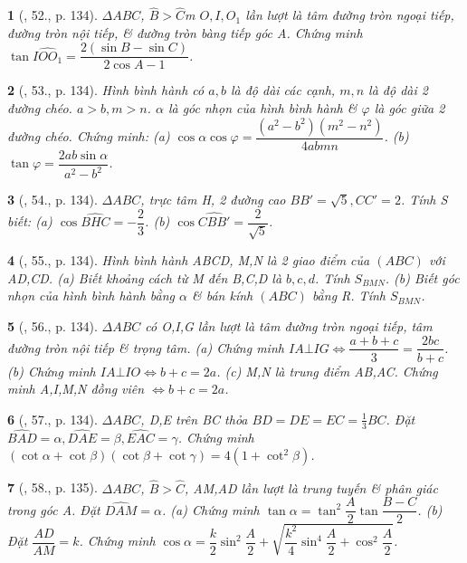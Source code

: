 \documentclass{article}
\newtheorem{baitoan}{}
\begin{document}
\begin{baitoan}[\cite{TLCT_hinh_hoc_10}, 52., p. 134]
	$\Delta ABC$, $\widehat{B} > \widehat{C}$m $O,I,O_1$ lần lượt là tâm đường tròn ngoại tiếp, đường tròn nội tiếp, \& đường tròn bàng tiếp góc A. Chứng minh $\tan\widehat{IOO_1} = \dfrac{2(\sin B - \sin C)}{2\cos A - 1}$.
\end{baitoan}

\begin{baitoan}[\cite{TLCT_hinh_hoc_10}, 53., p. 134]
	Hình bình hành có $a,b$ là độ dài các cạnh, $m,n$ là độ dài 2 đường chéo. $a > b,m > n$. $\alpha$ là góc nhọn của hình bình hành \& $\varphi$ là góc giữa 2 đường chéo. Chứng minh: (a) $\cos\alpha\cos\varphi = \dfrac{(a^2 - b^2)(m^2 - n^2)}{4abmn}$. (b) $\tan\varphi = \dfrac{2ab\sin\alpha}{a^2 - b^2}$.
\end{baitoan}

\begin{baitoan}[\cite{TLCT_hinh_hoc_10}, 54., p. 134]
	$\Delta ABC$, trực tâm H, 2 đường cao $BB' = \sqrt{5},CC' = 2$. Tính S biết: (a) $\cos\widehat{BHC} = -\dfrac{2}{3}$. (b) $\cos\widehat{CBB'} = \dfrac{2}{\sqrt{5}}$.
\end{baitoan}

\begin{baitoan}[\cite{TLCT_hinh_hoc_10}, 55., p. 134]
	Hình bình hành ABCD, M,N là 2 giao điểm của $(ABC)$ với AD,CD. (a) Biết khoảng cách từ M đến B,C,D là $b,c,d$. Tính $S_{BMN}$. (b) Biết góc nhọn của hình bình hành bằng $\alpha$ \& bán kính $(ABC)$ bằng R. Tính $S_{BMN}$.
\end{baitoan}

\begin{baitoan}[\cite{TLCT_hinh_hoc_10}, 56., p. 134]
	$\Delta ABC$ có O,I,G lần lượt là tâm đường tròn ngoại tiếp, tâm đường tròn nội tiếp \& trọng tâm. (a) Chứng minh $IA\bot IG\Leftrightarrow\dfrac{a + b + c}{3} = \dfrac{2bc}{b + c}$. (b) Chứng minh $IA\bot IO\Leftrightarrow b + c = 2a$. (c) M,N là trung điểm AB,AC. Chứng minh A,I,M,N đồng viên $\Leftrightarrow b + c = 2a$.
\end{baitoan}

\begin{baitoan}[\cite{TLCT_hinh_hoc_10}, 57., p. 134]
	$\Delta ABC$, D,E trên BC thỏa $BD = DE = EC = \frac{1}{3}BC$. Đặt $\widehat{BAD} = \alpha,\widehat{DAE} = \beta,\widehat{EAC} = \gamma$. Chứng minh $(\cot\alpha + \cot\beta)(\cot\beta + \cot\gamma) = 4(1 + \cot^2\beta)$.
\end{baitoan}

\begin{baitoan}[\cite{TLCT_hinh_hoc_10}, 58., p. 135]
	$\Delta ABC$, $\widehat{B} > \widehat{C}$, AM,AD lần lượt là trung tuyến \& phân giác trong góc A. Đặt $\widehat{DAM} = \alpha$. (a) Chứng minh $\tan\alpha = \tan^2\dfrac{A}{2}\tan\dfrac{B - C}{2}$. (b) Đặt $\dfrac{AD}{AM} = k$. Chứng minh $\cos\alpha = \dfrac{k}{2}\sin^2\dfrac{A}{2} + \sqrt{\dfrac{k^2}{4}\sin^4\dfrac{A}{2} + \cos^2\dfrac{A}{2}}$.
\end{baitoan}
\end{document}
